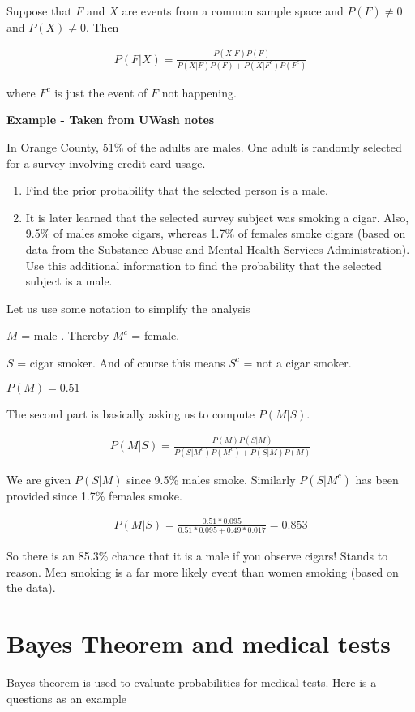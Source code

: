 \documentclass[12pt]{article}
\begin{document}
Suppose that $F$ and $X$ are events from a common sample space and $P(F) \neq 0$ and $P(X) \neq 0$. Then

\begin{align*}
P(F|X) = \frac{P(X|F)P(F)}{P(X|F)P(F) + P(X|F^c)P(F^c)}
\end{align*}

where $F^c$ is just the event of $F$ not happening.

\textbf{Example - Taken from UWash notes}

In Orange County, 51\% of the adults are males. One adult is randomly selected
for a survey involving credit card usage.
\begin{enumerate}
\item Find the prior probability that the selected person is a male.
\item It is later learned that the selected survey subject was smoking a cigar. Also, 9.5\%
of males smoke cigars, whereas 1.7\% of females smoke cigars (based on data
from the Substance Abuse and Mental Health Services Administration). Use this
additional information to find the probability that the selected subject is a male.
\end{enumerate}

Let us use some notation to simplify the analysis

$M$ = male . Thereby $M^c$ = female. 

$S$ = cigar smoker. And of course this means $S^c$ = not a cigar smoker.

$P(M) = 0.51$

The second part is basically asking us to compute $P(M|S)$.

\begin{align*}
P(M|S) = \frac{P(M) P(S|M)}{P(S|M^c) P(M^c) + P(S|M) P(M)}
\end{align*}

We are given $P(S|M)$ since 9.5\% males smoke. Similarly $P(S|M^c)$ has been provided since 1.7\% females smoke.

\begin{align*}
P(M|S) = \frac{0.51 * 0.095}{0.51 * 0.095 + 0.49 * 0.017}
= 0.853
\end{align*}

So there is an 85.3\% chance that it is a male if you observe cigars! Stands to reason. Men smoking is a far more likely event than women smoking (based on the data). 

\section*{Bayes Theorem and medical tests}
Bayes theorem is used to evaluate probabilities for medical tests. Here is a questions as an example
\end{document}
